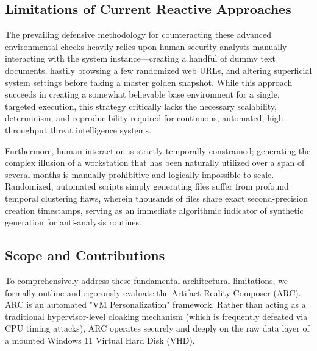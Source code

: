 \documentclass{ieeeaccess}
\begin{document}
\subsection{Limitations of Current Reactive Approaches}
The prevailing defensive methodology for counteracting these advanced environmental checks heavily relies upon human security analysts manually interacting with the system instance—creating a handful of dummy text documents, hastily browsing a few randomized web URLs, and altering superficial system settings before taking a master golden snapshot. While this approach succeeds in creating a somewhat believable base environment for a single, targeted execution, this strategy critically lacks the necessary scalability, determinism, and reproducibility required for continuous, automated, high-throughput threat intelligence systems. 

Furthermore, human interaction is strictly temporally constrained; generating the complex illusion of a workstation that has been naturally utilized over a span of several months is manually prohibitive and logically impossible to scale. Randomized, automated scripts simply generating files suffer from profound temporal clustering flaws, wherein thousands of files share exact second-precision creation timestamps, serving as an immediate algorithmic indicator of synthetic generation for anti-analysis routines.

\subsection{Scope and Contributions}
To comprehensively address these fundamental architectural limitations, we formally outline and rigorously evaluate the Artifact Reality Composer (ARC). ARC is an automated "VM Personalization" framework. Rather than acting as a traditional hypervisor-level cloaking mechanism (which is frequently defeated via CPU timing attacks), ARC operates securely and deeply on the raw data layer of a mounted Windows 11 Virtual Hard Disk (VHD).
\end{document}
